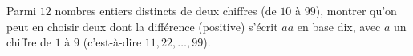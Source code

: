 Parmi $12$ nombres entiers distincts de deux chiffres (de $10$ à $99$),
montrer qu'on peut en choisir deux dont la différence (positive) s'écrit $aa$
en base dix, avec $a$ un chiffre de $1$ à $9$ (c'est-à-dire $11, 22, \ldots, 99$).
